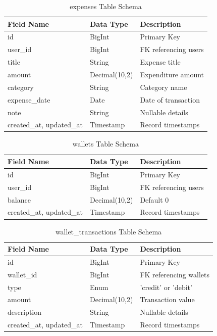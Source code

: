\begin{longtable}{|l|l|p{7.5cm}|}
\caption{expenses Table Schema} \\
\hline
\textbf{Field Name} & \textbf{Data Type} & \textbf{Description} \\ \hline
id & BigInt & Primary Key \\ \hline
user\_id & BigInt & FK referencing users \\ \hline
title & String & Expense title \\ \hline
amount & Decimal(10,2) & Expenditure amount \\ \hline
category & String & Category name \\ \hline
expense\_date & Date & Date of transaction \\ \hline
note & String & Nullable details \\ \hline
created\_at, updated\_at & Timestamp & Record timestamps \\ \hline
\end{longtable}

\begin{longtable}{|l|l|p{7.5cm}|}
\caption{wallets Table Schema} \\
\hline
\textbf{Field Name} & \textbf{Data Type} & \textbf{Description} \\ \hline
id & BigInt & Primary Key \\ \hline
user\_id & BigInt & FK referencing users \\ \hline
balance & Decimal(10,2) & Default 0 \\ \hline
created\_at, updated\_at & Timestamp & Record timestamps \\ \hline
\end{longtable}

\begin{longtable}{|l|l|p{7.5cm}|}
\caption{wallet\_transactions Table Schema} \\
\hline
\textbf{Field Name} & \textbf{Data Type} & \textbf{Description} \\ \hline
id & BigInt & Primary Key \\ \hline
wallet\_id & BigInt & FK referencing wallets \\ \hline
type & Enum & 'credit' or 'debit' \\ \hline
amount & Decimal(10,2) & Transaction value \\ \hline
description & String & Nullable details \\ \hline
created\_at, updated\_at & Timestamp & Record timestamps \\ \hline
\end{longtable}


